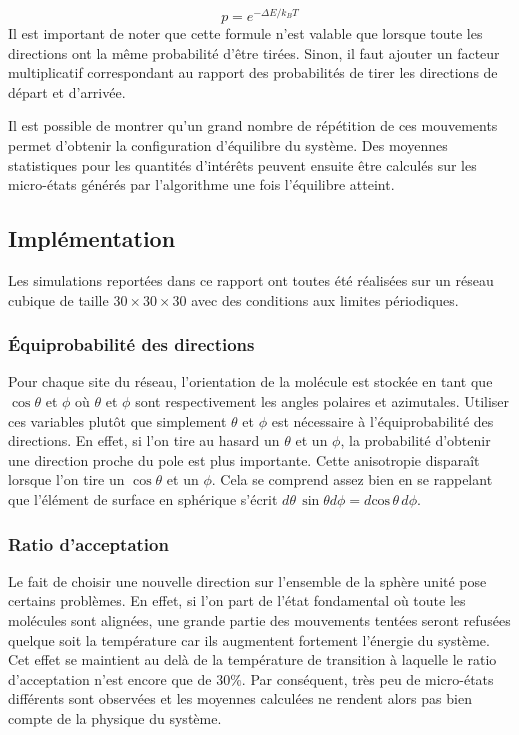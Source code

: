 \documentclass[11pt,a4paper]{article}
\numberwithin{equation}{section}
\begin{document}
\begin{equation}
p = e^{-\Delta E / k_B T}
\label{boltzmannprob}
\end{equation}
Il est important de noter que cette formule n'est valable que lorsque toute les directions ont la même probabilité d'être tirées. Sinon, il faut ajouter un facteur multiplicatif correspondant au rapport des probabilités de tirer les directions de départ et d'arrivée.
\medskip

Il est possible de montrer qu'un grand nombre de répétition de ces mouvements permet d'obtenir la configuration d'équilibre du système. Des moyennes statistiques pour les quantités d'intérêts peuvent ensuite être calculés sur les micro-états générés par l'algorithme une fois l'équilibre atteint.

\subsection{Implémentation}
Les simulations reportées dans ce rapport ont toutes été réalisées sur un réseau cubique de taille $30\times 30\times 30$ avec des conditions aux limites périodiques. 

\subsubsection{Équiprobabilité des directions}
Pour chaque site du réseau, l'orientation de la molécule est stockée en tant que $\cos \theta$ et $\phi$ où $\theta$ et $\phi$ sont respectivement les angles polaires et azimutales. Utiliser ces variables plutôt que simplement $\theta$ et $\phi$ est nécessaire à l'équiprobabilité des directions. En effet, si l'on tire au hasard un $\theta$ et un $\phi$, la probabilité d'obtenir une direction proche du pole est plus importante. Cette anisotropie disparaît lorsque l'on tire un $\cos \theta$ et un $\phi$. Cela se comprend assez bien en se rappelant que l'élément de surface en sphérique s'écrit $d\theta\, \sin \theta d\phi = d\text{cos}\,\theta\, d\phi$.

\subsubsection{Ratio d'acceptation}
Le fait de choisir une nouvelle direction sur l'ensemble de la sphère unité pose certains problèmes. En effet, si l'on part de l'état fondamental où toute les molécules sont alignées, une grande partie des mouvements tentées seront refusées quelque soit la température car ils augmentent fortement l'énergie du système. Cet effet se maintient au delà de la température de transition à laquelle le ratio d'acceptation n'est encore que de   30$\%$. Par conséquent, très peu de micro-états différents sont observées et les moyennes calculées ne rendent alors pas bien compte de la physique du système.
\end{document}
